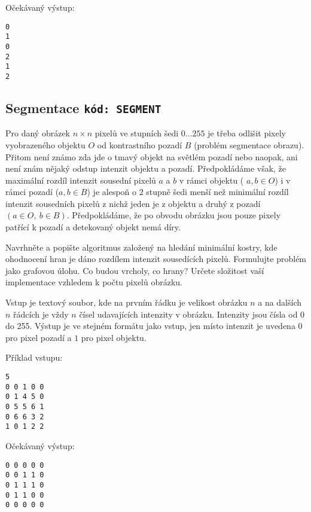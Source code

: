 \documentclass[a4paper,10pt]{article}
\begin{document}
Očekávaný výstup:
\begin{verbatim}
0
1
0
2
1
2
\end{verbatim}




\subsection{Segmentace \hfill{\tt kód: SEGMENT}}
Pro daný obrázek $n\times n$ pixelů ve stupních šedi $0 \dots 255$ je třeba odlišit pixely vyobrazeného objektu $O$ od 
kontrastního pozadí $B$ (problém segmentace obrazu). Přitom není známo zda jde o tmavý objekt na světlém pozadí nebo naopak,
ani není znám nějaký odstup intenzit objektu a pozadí. Předpokládáme však, že maximální rozdíl intenzit sousední pixelů $a$ a $b$ 
v rámci objektu ( $a, b \in O$) i v rámci pozadí ($a,b \in B$) je alespoň o $2$ stupně šedi menší než minimální rozdíl intenzit 
sousedních pixelů z nichž jeden je z objektu a druhý z pozadí $(a\in O,\ b\in B)$. Předpokládáme, že po obvodu obrázku 
jsou pouze pixely patřící k pozadí a detekovaný objekt nemá díry.

Navrhněte a popište algoritmus založený na hledání minimální kostry, kde ohodnocení hran je dáno rozdílem 
intenzit sousedících pixelů. Formulujte problém jako grafovou úlohu. Co budou vrcholy, co hrany?  
Určete složitost vaší implementace  vzhledem k počtu pixelů obrázku.

Vstup je textový soubor, kde na prvním řádku je velikost obrázku $n$ a na dalších $n$ řádcích je vždy $n$ čísel udavajících intenzity
v obrázku. Intenzity jsou čísla od 0 do 255. Výstup je ve stejném formátu jako vstup, jen místo intenzit je 
uvedena $0$ pro pixel pozadí a $1$ pro pixel objektu.

Příklad vstupu:
\begin{verbatim}
5
0 0 1 0 0
0 1 4 5 0
0 5 5 6 1
0 6 6 3 2
1 0 1 2 2 
\end{verbatim}

Očekávaný výstup:
\begin{verbatim}
0 0 0 0 0
0 0 1 1 0
0 1 1 1 0
0 1 1 0 0
0 0 0 0 0 
\end{verbatim}



\end{document}

